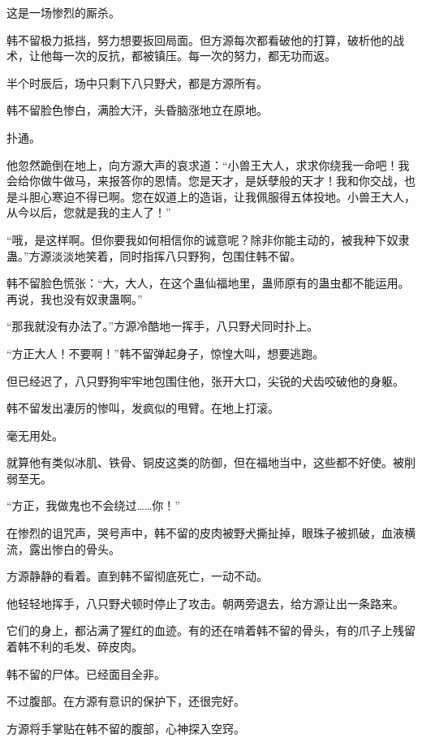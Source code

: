 
\begin{this_body}

这是一场惨烈的厮杀。

韩不留极力抵挡，努力想要扳回局面。但方源每次都看破他的打算，破析他的战术，让他每一次的反抗，都被镇压。每一次的努力，都无功而返。

半个时辰后，场中只剩下八只野犬，都是方源所有。

韩不留脸色惨白，满脸大汗，头昏脑涨地立在原地。

扑通。

他忽然跪倒在地上，向方源大声的哀求道：“小兽王大人，求求你绕我一命吧！我会给你做牛做马，来报答你的恩情。您是天才，是妖孽般的天才！我和你交战，也是斗胆心寒迫不得已啊。您在奴道上的造诣，让我佩服得五体投地。小兽王大人，从今以后，您就是我的主人了！”

“哦，是这样啊。但你要我如何相信你的诚意呢？除非你能主动的，被我种下奴隶蛊。”方源淡淡地笑着，同时指挥八只野狗，包围住韩不留。

韩不留脸色慌张：“大，大人，在这个蛊仙福地里，蛊师原有的蛊虫都不能运用。再说，我也没有奴隶蛊啊。”

“那我就没有办法了。”方源冷酷地一挥手，八只野犬同时扑上。

“方正大人！不要啊！”韩不留弹起身子，惊惶大叫，想要逃跑。

但已经迟了，八只野狗牢牢地包围住他，张开大口，尖锐的犬齿咬破他的身躯。

韩不留发出凄厉的惨叫，发疯似的甩臂。在地上打滚。

毫无用处。

就算他有类似冰肌、铁骨、铜皮这类的防御，但在福地当中，这些都不好使。被削弱至无。

“方正，我做鬼也不会绕过……你！”

在惨烈的诅咒声，哭号声中，韩不留的皮肉被野犬撕扯掉，眼珠子被抓破，血液横流，露出惨白的骨头。

方源静静的看着。直到韩不留彻底死亡，一动不动。

他轻轻地挥手，八只野犬顿时停止了攻击。朝两旁退去，给方源让出一条路来。

它们的身上，都沾满了猩红的血迹。有的还在啃着韩不留的骨头，有的爪子上残留着韩不利的毛发、碎皮肉。

韩不留的尸体。已经面目全非。

不过腹部。在方源有意识的保护下，还很完好。

方源将手掌贴在韩不留的腹部，心神探入空窍。


\end{this_body}
